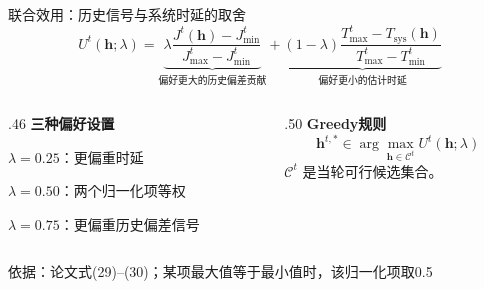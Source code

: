 \documentclass[aspectratio=169,11pt]{beamer}
\newcommand{\key}[1]{{\color{Teal}\bfseries #1}}
\newcommand{\src}[1]{\vfill{\color{Gray}\fontsize{7.5}{9}\selectfont 依据：#1\par}}
\begin{document}
\begin{frame}{联合效用：历史信号与系统时延的取舍}
\[
U^t(\mathbf h;\lambda)=
\underbrace{\lambda
\frac{J^t(\mathbf h)-J_{\min}^t}
{J_{\max}^t-J_{\min}^t}}_{\text{偏好更大的历史偏差贡献}}
+
\underbrace{(1-\lambda)
\frac{T_{\max}^t-T_{\mathrm{sys}}(\mathbf h)}
{T_{\max}^t-T_{\min}^t}}_{\text{偏好更小的估计时延}}
\]
\par\vspace{.18cm}
\begin{columns}[T,onlytextwidth]
\begin{column}{.46\textwidth}
\key{三种偏好设置}\par\vspace{.1cm}
$\lambda=0.25$：更偏重时延\par
$\lambda=0.50$：两个归一化项等权\par
$\lambda=0.75$：更偏重历史偏差信号
\end{column}
\begin{column}{.50\textwidth}
\textbf{Greedy规则}
\[
\mathbf h^{t,*}\in
\arg\max_{\mathbf h\in\mathcal C^t}
U^t(\mathbf h;\lambda)
\]
$\mathcal C^t$ 是当轮可行候选集合。
\end{column}
\end{columns}
\src{论文式(29)--(30)；某项最大值等于最小值时，该归一化项取0.5}
\end{frame}
\end{document}
